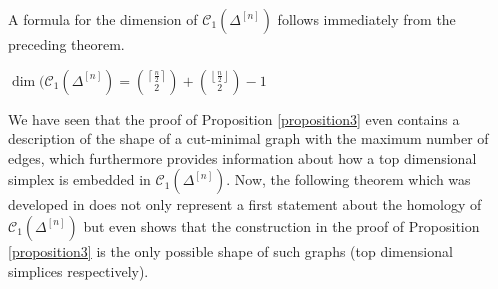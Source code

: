 A formula for the dimension of \(\mathcal{C}_1(\Delta^{[n]})\) follows immediately from the preceding theorem.

\begin{cor}
\(\dim(\mathcal{C}_1(\Delta^{[n]})=\binom{\left\lceil\frac{n}{2}\right\rceil}{2}+\binom{\left\lfloor\frac{n}{2}\right\rfloor}{2}-1\)
\end{cor}

We have seen that the proof of Proposition \ref{proposition3} even contains a description of the shape of a cut-minimal graph with the maximum number of edges, which furthermore provides information about how a top dimensional simplex is embedded in \(\mathcal{C}_1(\Delta^{[n]})\). Now, the following theorem which was developed in \cite{10} does not only represent a first statement about the homology of \(\mathcal{C}_1(\Delta^{[n]})\) but even shows that the construction in the proof of Proposition \ref{proposition3} is the only possible shape of such graphs (top dimensional simplices respectively).


